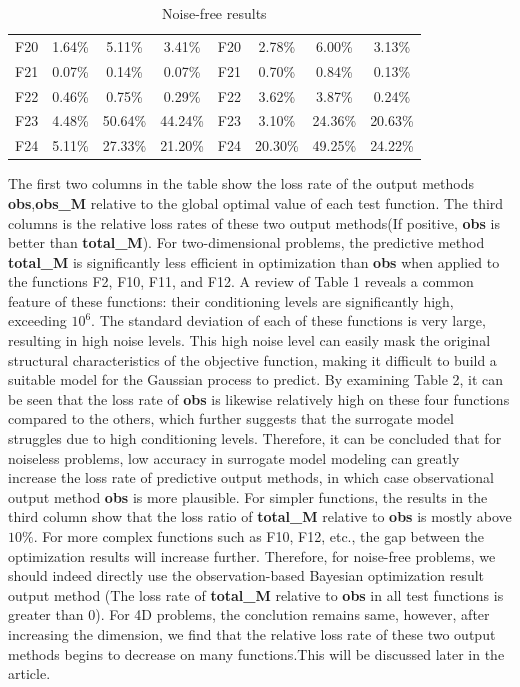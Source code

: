 \documentclass{article}
\begin{document}
\begin{table}[!ht]
{\begin{tabular}{|c|ccc|c|ccc|}
		\cline{1-8}
        F20 & 1.64\% & 5.11\% & 3.41\% & F20 & 2.78\% & 6.00\% & 3.13\% \\ 
        F21 & 0.07\% & 0.14\% & 0.07\% & F21 & 0.70\% & 0.84\% & 0.13\% \\ 
        F22 & 0.46\% & 0.75\% & 0.29\% & F22 & 3.62\% & 3.87\% & 0.24\% \\ 
        F23 & 4.48\% & 50.64\% & 44.24\% & F23 & 3.10\% & 24.36\% & 20.63\% \\ 
        F24 & 5.11\% & 27.33\% & 21.20\% & F24 & 20.30\% & 49.25\% & 24.22\% \\ \hline
    \end{tabular}
	}
	\caption{Noise-free results}
\end{table}
 
  \hspace{2em}The first two columns in the table show the loss rate of the output methods \textbf{obs},\textbf{obs\_M} relative to the global optimal value of each test function. The third columns is the relative loss rates of these two output methods(If positive, \textbf{obs} is better than \textbf{total\_M}). For two-dimensional problems, the predictive method \textbf{total\_M} is significantly less efficient in optimization than \textbf{obs} when applied to the functions F2, F10, F11, and F12. A review of Table 1 reveals a common feature of these functions: their conditioning levels are significantly high, exceeding $10^6$. The standard deviation of each of these functions is very large, resulting in high noise levels. This high noise level can easily mask the original structural characteristics of the objective function, making it difficult to build a suitable model for the Gaussian process to predict. By examining Table 2, it can be seen that the loss rate of \textbf{obs} is likewise relatively high on these four functions compared to the others, which further suggests that the surrogate model struggles due to high conditioning levels. Therefore, it can be concluded that for noiseless problems, low accuracy in surrogate model modeling can greatly increase the loss rate of predictive output methods, in which case observational output method \textbf{obs} is more plausible. For simpler functions, the results in the third column show that the loss ratio of \textbf{total\_M} relative to \textbf{obs} is mostly above $10\%$. For more complex functions such as F10, F12, etc., the gap between the optimization results will increase further. Therefore, for noise-free problems, we should indeed directly use the observation-based Bayesian optimization result output method (The loss rate of \textbf{total\_M} relative to \textbf{obs} in all test functions is greater than 0). For 4D problems, the conclution remains same, however, after increasing the dimension, we find that the relative loss rate of these two output methods begins to decrease on many functions.This will be discussed later in the article.
\end{document}
